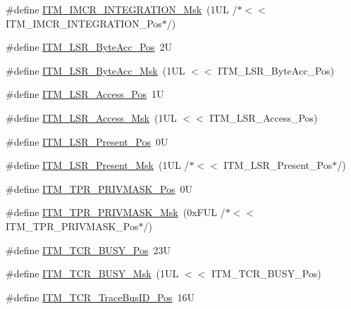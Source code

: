 \begin{DoxyCompactItemize}
\#define \hyperlink{group___c_m_s_i_s___i_t_m_ga8838bd3dd04c1a6be97cd946364a3fd2}{I\-T\-M\-\_\-\-I\-M\-C\-R\-\_\-\-I\-N\-T\-E\-G\-R\-A\-T\-I\-O\-N\-\_\-\-Msk}~(1\-U\-L /$\ast$$<$$<$ I\-T\-M\-\_\-\-I\-M\-C\-R\-\_\-\-I\-N\-T\-E\-G\-R\-A\-T\-I\-O\-N\-\_\-\-Pos$\ast$/)
\item 
\#define \hyperlink{group___c_m_s_i_s___i_t_m_gabfae3e570edc8759597311ed6dfb478e}{I\-T\-M\-\_\-\-L\-S\-R\-\_\-\-Byte\-Acc\-\_\-\-Pos}~2\-U
\item 
\#define \hyperlink{group___c_m_s_i_s___i_t_m_ga91f492b2891bb8b7eac5b58de7b220f4}{I\-T\-M\-\_\-\-L\-S\-R\-\_\-\-Byte\-Acc\-\_\-\-Msk}~(1\-U\-L $<$$<$ I\-T\-M\-\_\-\-L\-S\-R\-\_\-\-Byte\-Acc\-\_\-\-Pos)
\item 
\#define \hyperlink{group___c_m_s_i_s___i_t_m_ga144a49e12b83ad9809fdd2769094fdc0}{I\-T\-M\-\_\-\-L\-S\-R\-\_\-\-Access\-\_\-\-Pos}~1\-U
\item 
\#define \hyperlink{group___c_m_s_i_s___i_t_m_gac8ae69f11c0311da226c0c8ec40b3d37}{I\-T\-M\-\_\-\-L\-S\-R\-\_\-\-Access\-\_\-\-Msk}~(1\-U\-L $<$$<$ I\-T\-M\-\_\-\-L\-S\-R\-\_\-\-Access\-\_\-\-Pos)
\item 
\#define \hyperlink{group___c_m_s_i_s___i_t_m_gaf5740689cf14564d3f3fd91299b6c88d}{I\-T\-M\-\_\-\-L\-S\-R\-\_\-\-Present\-\_\-\-Pos}~0\-U
\item 
\#define \hyperlink{group___c_m_s_i_s___i_t_m_gaa5bc2a7f5f1d69ff819531f5508bb017}{I\-T\-M\-\_\-\-L\-S\-R\-\_\-\-Present\-\_\-\-Msk}~(1\-U\-L /$\ast$$<$$<$ I\-T\-M\-\_\-\-L\-S\-R\-\_\-\-Present\-\_\-\-Pos$\ast$/)
\item 
\#define \hyperlink{group___c_m_s_i_s___i_t_m_ga7abe5e590d1611599df87a1884a352e8}{I\-T\-M\-\_\-\-T\-P\-R\-\_\-\-P\-R\-I\-V\-M\-A\-S\-K\-\_\-\-Pos}~0\-U
\item 
\#define \hyperlink{group___c_m_s_i_s___i_t_m_ga168e089d882df325a387aab3a802a46b}{I\-T\-M\-\_\-\-T\-P\-R\-\_\-\-P\-R\-I\-V\-M\-A\-S\-K\-\_\-\-Msk}~(0x\-F\-U\-L /$\ast$$<$$<$ I\-T\-M\-\_\-\-T\-P\-R\-\_\-\-P\-R\-I\-V\-M\-A\-S\-K\-\_\-\-Pos$\ast$/)
\item 
\#define \hyperlink{group___c_m_s_i_s___i_t_m_ga9174ad4a36052c377cef4e6aba2ed484}{I\-T\-M\-\_\-\-T\-C\-R\-\_\-\-B\-U\-S\-Y\-\_\-\-Pos}~23\-U
\item 
\#define \hyperlink{group___c_m_s_i_s___i_t_m_ga43ad7cf33de12f2ef3a412d4f354c60f}{I\-T\-M\-\_\-\-T\-C\-R\-\_\-\-B\-U\-S\-Y\-\_\-\-Msk}~(1\-U\-L $<$$<$ I\-T\-M\-\_\-\-T\-C\-R\-\_\-\-B\-U\-S\-Y\-\_\-\-Pos)
\item 
\#define \hyperlink{group___c_m_s_i_s___i_t_m_gaca0281de867f33114aac0636f7ce65d3}{I\-T\-M\-\_\-\-T\-C\-R\-\_\-\-Trace\-Bus\-I\-D\-\_\-\-Pos}~16\-U
$$
\end{DoxyCompactItemize}
